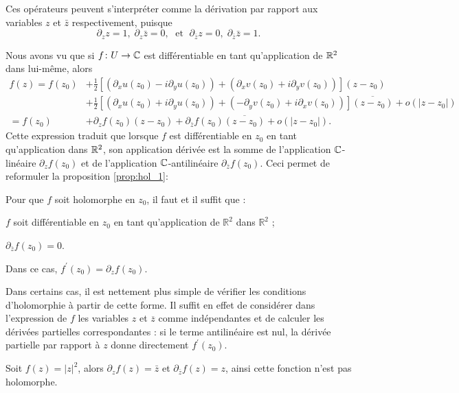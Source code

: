 Ces opérateurs peuvent s'interpréter comme la dérivation par rapport aux variables $z$ et $\bar{z}$ respectivement, puisque 
\[\partial_z z=1, \; \partial_z \bar{z}=0, \; \text{ et } \;  \partial_{\bar{z}} z=0, \;\partial_{\bar{z}}\bar{z}=1.\]

Nous avons vu que si $f \colon U \to \mathbb{C}$ est différentiable en tant qu'application de $\mathbb R^2$ dans lui-même, alors
\begin{align*}
f(z)  = f(z_0) &+ \frac{1}{2} \left[(\partial_x u(z_0)-i \partial_y u(z_0)) + (\partial_x v(z_0) + i \partial_y v(z_0))\right](z-z_0) \\  &+  \frac{1}{2} \left[(\partial_x u(z_0) + i \partial_y u(z_0)) + (- \partial_y v(z_0) + i \partial_x v(z_0))\right]\overline{(z-z_0)} + o(\lvert z-z_0 \rvert) \\
=f(z_0) &+ \partial_z f(z_0) (z-z_0) + \partial_{\bar{z}} f(z_0) \overline{(z-z_0)} + o(\lvert z-z_0 \rvert).
\end{align*}
Cette expression traduit que lorsque $f$ est différentiable en $z_0$ en tant qu'application dans $\mathbb R^2$, son application dérivée est la somme de l'application $\mathbb{C}$-linéaire $\partial_z f(z_0)$ et de l'application $\mathbb{C}$-antilinéaire $ \partial_{\bar{z}} f(z_0)$. Ceci permet de reformuler la proposition \ref{prop:hol_1}:
\begin{fprop}
Pour que $f$ soit holomorphe en $z_0$, il faut et il suffit que :
\begin{MYenumerate}
\item $f$ soit différentiable en $z_0$ en tant qu'application de $\mathbb{R}^2$ dans $\mathbb{R}^2$ ;
\item $ \partial_{\bar{z}}f(z_0)=0$.
\end{MYenumerate}
Dans ce cas, $f^\prime(z_0)=\partial_z f(z_0)$.
\end{fprop}

Dans certains cas, il est nettement
plus simple de vérifier les conditions d'holomorphie à partir de cette forme. Il
suffit en effet de considérer dans l'expression de $f$ les variables
$z$ et $\overline{z}$ comme indépendantes et de calculer les dérivées partielles
correspondantes : si le terme antilinéaire est nul, la dérivée partielle par
rapport à $z$ donne directement $f^\prime(z_0)$.

\begin{exem} Soit $f(z)=\lvert z\rvert^2$, alors $\partial_z f(z)=\bar{z}$ et $ \partial_{\bar{z}} f(z)=z$, ainsi cette fonction n'est pas holomorphe. 

\end{exem}


